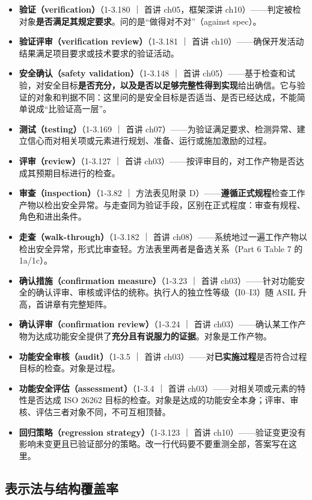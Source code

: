 \begin{itemize}
\item \textbf{验证（verification）}（1-3.180 ｜ 首讲 ch05，框架深讲 ch10）——判定被检对象\textbf{是否满足其规定要求}。问的是“做得对不对”（against spec）。
\item \textbf{验证评审（verification review）}（1-3.181 ｜ 首讲 ch10）——确保开发活动结果满足项目要求或技术要求的验证活动。
\item \textbf{安全确认（safety validation）}（1-3.148 ｜ 首讲 ch05）——基于检查和试验，对安全目标\textbf{是否充分，以及是否以足够完整性得到实现}给出确信。它与验证的对象和判据不同：这里问的是安全目标是否适当、是否已经达成，不能简单说成“比验证高一层”。
\item \textbf{测试（testing）}（1-3.169 ｜ 首讲 ch07）——为验证满足要求、检测异常、建立信心而对相关项或元素进行规划、准备、运行或施加激励的过程。
\item \textbf{评审（review）}（1-3.127 ｜ 首讲 ch03）——按评审目的，对工作产物是否达成其预期目标进行的检查。
\item \textbf{审查（inspection）}（1-3.82 ｜ 方法表见附录 D）——\textbf{遵循正式规程}检查工作产物以检出安全异常。与走查同为验证手段，区别在正式程度：审查有规程、角色和进出条件。
\item \textbf{走查（walk-through）}（1-3.182 ｜ 首讲 ch08）——系统地过一遍工作产物以检出安全异常，形式比审查轻。方法表里两者是备选关系（Part 6 Table 7 的 1a/1c）。
\item \textbf{确认措施（confirmation measure）}（1-3.23 ｜ 首讲 ch03）——针对功能安全的确认评审、审核或评估的统称。执行人的独立性等级（I0–I3）随 ASIL 升高，首讲章有完整矩阵。
\item \textbf{确认评审（confirmation review）}（1-3.24 ｜ 首讲 ch03）——确认某工作产物为达成功能安全提供了\textbf{充分且有说服力的证据}。对象是工作产物。
\item \textbf{功能安全审核（audit）}（1-3.5 ｜ 首讲 ch03）——对\textbf{已实施过程}是否符合过程目标的检查。对象是过程。
\item \textbf{功能安全评估（assessment）}（1-3.4 ｜ 首讲 ch03）——对相关项或元素的特性是否达成 ISO 26262 目标的检查。对象是达成的功能安全本身；评审、审核、评估三者对象不同，不可互相顶替。
\item \textbf{回归策略（regression strategy）}（1-3.123 ｜ 首讲 ch10）——验证变更没有影响未变更且已验证部分的策略。改一行代码要不要重测全部，答案写在这里。
\end{itemize}

\subsection{表示法与结构覆盖率}

